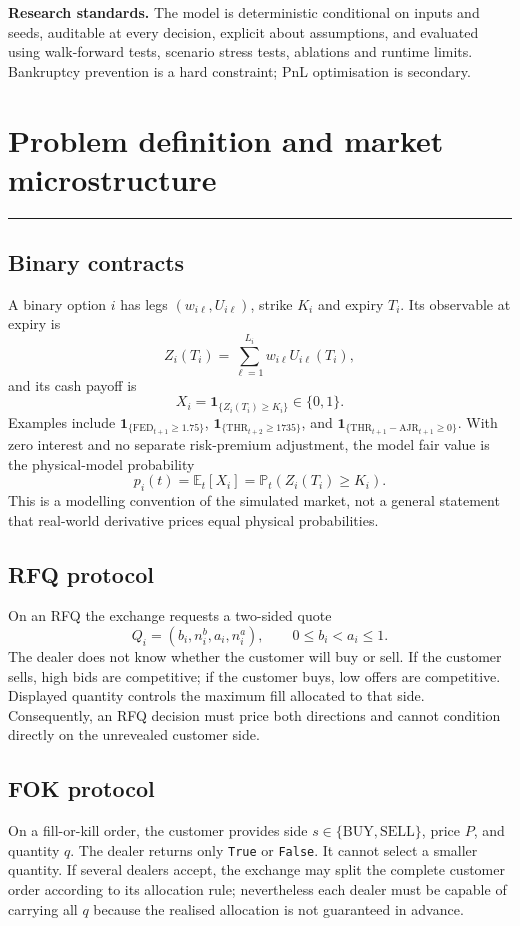 \documentclass[10pt,a4paper]{article}
\newcommand{\E}{\mathbb{E}}
\newcommand{\1}{\mathbf{1}}
\newcommand{\sectionrule}{\vspace{-2pt}\noindent\color{navy}\rule{\textwidth}{0.7pt}\color{black}\vspace{2pt}}
\begin{document}
\textbf{Research standards.}  The model is deterministic conditional on inputs and
seeds, auditable at every decision, explicit about assumptions, and evaluated using
walk-forward tests, scenario stress tests, ablations and runtime limits.  Bankruptcy
prevention is a hard constraint; PnL optimisation is secondary.

\clearpage

\section{Problem definition and market microstructure}
\sectionrule

\subsection{Binary contracts}
A binary option $i$ has legs $(w_{i\ell},U_{i\ell})$, strike $K_i$ and expiry
$T_i$.  Its observable at expiry is
\[
 Z_i(T_i)=\sum_{\ell=1}^{L_i}w_{i\ell}U_{i\ell}(T_i),
\]
and its cash payoff is
\[
 X_i=\1_{\{Z_i(T_i)\ge K_i\}}\in\{0,1\}.
\]
Examples include $\1_{\{\mathrm{FED}_{t+1}\ge1.75\}}$,
$\1_{\{\mathrm{THR}_{t+2}\ge1735\}}$, and
$\1_{\{\mathrm{THR}_{t+1}-\mathrm{AJR}_{t+1}\ge0\}}$.  With zero interest and
no separate risk-premium adjustment, the model fair value is the physical-model
probability
\[
 p_i(t)=\E_t[X_i]=\mathbb{P}_t\!\left(Z_i(T_i)\ge K_i\right).
\]
This is a modelling convention of the simulated market, not a general statement that
real-world derivative prices equal physical probabilities.

\subsection{RFQ protocol}
On an RFQ the exchange requests a two-sided quote
\[
 Q_i=(b_i,n_i^b,a_i,n_i^a),\qquad 0\le b_i<a_i\le1.
\]
The dealer does not know whether the customer will buy or sell.  If the customer
sells, high bids are competitive; if the customer buys, low offers are competitive.
Displayed quantity controls the maximum fill allocated to that side.  Consequently,
an RFQ decision must price both directions and cannot condition directly on the
unrevealed customer side.

\subsection{FOK protocol}
On a fill-or-kill order, the customer provides side $s\in\{\mathrm{BUY},
\mathrm{SELL}\}$, price $P$, and quantity $q$.  The dealer returns only
\texttt{True} or \texttt{False}.  It cannot select a smaller quantity.  If several
dealers accept, the exchange may split the complete customer order according to its
allocation rule; nevertheless each dealer must be capable of carrying all $q$ because
the realised allocation is not guaranteed in advance.
\end{document}
